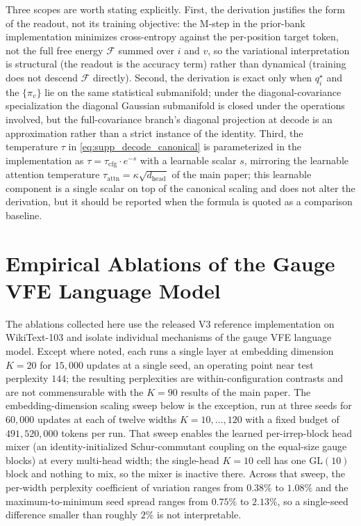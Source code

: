 \documentclass[twoside,11pt]{article}
\begin{document}
Three scopes are worth stating explicitly. First, the derivation justifies the form of the readout, not its training objective: the M-step in the prior-bank implementation minimizes cross-entropy against the per-position target token, not the full free energy $\mathcal{F}$ summed over $i$ and $v$, so the variational interpretation is structural (the readout is the accuracy term) rather than dynamical (training does not descend $\mathcal{F}$ directly). Second, the derivation is exact only when $q_i^{\star}$ and the $\{\pi_v\}$ lie on the same statistical submanifold; under the diagonal-covariance specialization the diagonal Gaussian submanifold is closed under the operations involved, but the full-covariance branch's diagonal projection at decode is an approximation rather than a strict instance of the identity. Third, the temperature $\tau$ in \eqref{eq:supp_decode_canonical} is parameterized in the implementation as $\tau = \tau_{\mathrm{cfg}} \cdot e^{-s}$ with a learnable scalar $s$, mirroring the learnable attention temperature $\tau_{\mathrm{attn}} = \kappa\sqrt{d_{\text{head}}}$ of the main paper; this learnable component is a single scalar on top of the canonical scaling and does not alter the derivation, but it should be reported when the formula is quoted as a comparison baseline.



\section{Empirical Ablations of the Gauge VFE Language Model}
\label{app:vfe3_ablations}

The ablations collected here use the released V3 reference implementation on WikiText-103 and isolate individual mechanisms of the gauge VFE language model. Except where noted, each runs a single layer at embedding dimension $K = 20$ for $15{,}000$ updates at a single seed, an operating point near test perplexity $144$; the resulting perplexities are within-configuration contrasts and are not commensurable with the $K = 90$ results of the main paper. The embedding-dimension scaling sweep below is the exception, run at three seeds for $60{,}000$ updates at each of twelve widths $K = 10,\ldots,120$ with a fixed budget of $491{,}520{,}000$ tokens per run. That sweep enables the learned per-irrep-block head mixer (an identity-initialized Schur-commutant coupling on the equal-size gauge blocks) at every multi-head width; the single-head $K = 10$ cell has one $\mathrm{GL}(10)$ block and nothing to mix, so the mixer is inactive there. Across that sweep, the per-width perplexity coefficient of variation ranges from $0.38\%$ to $1.08\%$ and the maximum-to-minimum seed spread ranges from $0.75\%$ to $2.13\%$, so a single-seed difference smaller than roughly $2\%$ is not interpretable.
\end{document}
